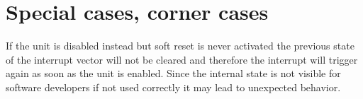 \section{Special cases, corner cases}

If the unit is disabled instead but soft reset is never activated the previous state of the interrupt vector will not be cleared and therefore the interrupt will trigger again as soon as the unit is enabled. Since the internal state is not visible for software developers if not used correctly it may lead to unexpected behavior. 
